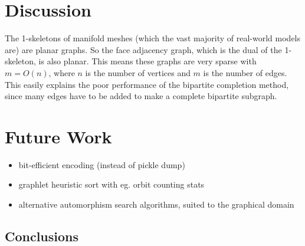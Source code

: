 \documentclass{egpubl}
\begin{document}
\section{Discussion}

The 1-skeletons of manifold meshes (which the vast majority of real-world models are) are planar graphs. So the face adjacency graph, which is the dual of the 1-skeleton, is also planar. This means these graphs are very sparse with $m = O(n)$, where $n$ is the number of vertices and $m$ is the number of edges. This easily explains the poor performance of the bipartite completion method, since many edges have to be added to make a complete bipartite subgraph.  


\section{Future Work}
\begin{itemize}
        \item bit-efficient encoding (instead of pickle dump)
        \item graphlet heuristic sort with eg. orbit counting stats
        \item alternative automorphism search algorithms, suited to the graphical domain
\end{itemize}

\subsection{Conclusions}



%



\end{document}
